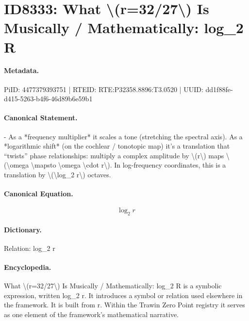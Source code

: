 \section*{ID8333: What \textbackslash{}(r=32/27\textbackslash{}) Is Musically / Mathematically: log\_2 R}
\paragraph{Metadata.}
PiID: 4477379393751 | RTEID: RTE:P32358.8896:T3.0520 | UUID: dd1f88fe-d415-5263-b4f6-46d89b6e59b1

\paragraph{Canonical Statement.}
- As a *frequency multiplier* it scales a tone (stretching the spectral axis). As a *logarithmic shift* (on the cochlear / tonotopic map) it’s a translation that “twists” phase relationships: multiply a complex amplitude by \textbackslash{}(r\textbackslash{}) maps \textbackslash{}(\textbackslash{}omega \textbackslash{}mapsto \textbackslash{}omega \textbackslash{}cdot r\textbackslash{}). In log-frequency coordinates, this is a translation by \textbackslash{}(\textbackslash{}log\_2 r\textbackslash{}) octaves.

\paragraph{Canonical Equation.}
\[
\log_2 r
\]

\paragraph{Dictionary.}
Relation: log\_2 r

\paragraph{Encyclopedia.}
What \textbackslash{}(r=32/27\textbackslash{}) Is Musically / Mathematically: log\_2 R is a symbolic expression, written log\_2 r. It introduces a symbol or relation used elsewhere in the framework. It is built from r. Within the Trawin Zero Point registry it serves as one element of the framework's mathematical narrative.

